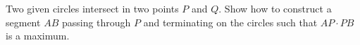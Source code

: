 Two given circles intersect in two points $ P$ and $ Q$. Show how to construct a segment $ AB$ passing through $ P$ and terminating on the circles such that $ AP \cdot PB$ is a maximum.